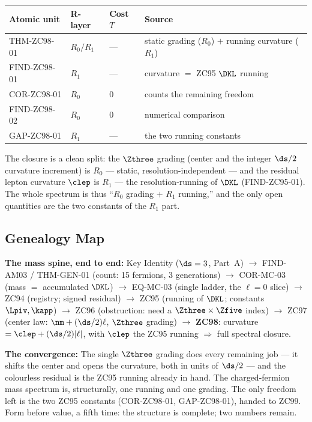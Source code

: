 \documentclass[12pt, a4paper]{article}
\begin{document}
\begin{layerbox}[title={R-Layer Assignments for ZC98}]
{\small\renewcommand{\arraystretch}{1.25}
\begin{center}
\begin{tabular}{@{}llll@{}}
\toprule
Atomic unit & R-layer & Cost $T$ & Source \\
\midrule
THM-ZC98-01  & $R_0/R_1$ & --- & static grading ($R_0$) $+$ running curvature ($R_1$) \\
FIND-ZC98-01 & $R_1$ & --- & curvature $=$ ZC95 $\DKL$ running \\
COR-ZC98-01  & $R_0$ & $0$ & counts the remaining freedom \\
FIND-ZC98-02 & $R_0$ & $0$ & numerical comparison \\
GAP-ZC98-01  & $R_1$ & --- & the two running constants \\
\bottomrule
\end{tabular}
\end{center}}
The closure is a clean split: the $\Zthree$ grading (center and the integer
$\ds/2$ curvature increment) is $R_0$ --- static, resolution-independent --- and
the residual lepton curvature $\clep$ is $R_1$ --- the resolution-running of
$\DKL$ (FIND-ZC95-01). The whole spectrum is thus ``$R_0$ grading $+$ $R_1$
running,'' and the only open quantities are the two constants of the $R_1$ part.
\end{layerbox}

\subsection{Genealogy Map}
\label{sec:genealogy-zc98}

\begin{genealogybox}[title={How ZC98 Sits in the Corpus --- and Closes Part~M's Spine}]
\textbf{The mass spine, end to end:}
Key Identity ($\ds=3$, Part~A) $\to$ FIND-AM03 / THM-GEN-01 (count: 15 fermions,
3 generations) $\to$ COR-MC-03 (mass $=$ accumulated $\DKL$) $\to$ EQ-MC-03
(single ladder, the $\ell=0$ slice) $\to$ ZC94 (registry; signed residual) $\to$
ZC95 (running of $\DKL$; constants $\Lpiv,\kapp$) $\to$ ZC96 (obstruction:
need a $\Zthree\times\Zfive$ index) $\to$ ZC97 (center law: $\nm+(\ds/2)\ell$,
$\Zthree$ grading) $\to$ \textbf{ZC98}: curvature $=\clep+(\ds/2)|\ell|$, with
$\clep$ the ZC95 running $\Rightarrow$ full spectral closure.

\smallskip
\textbf{The convergence:}
The single $\Zthree$ grading does every remaining job --- it shifts the center
and opens the curvature, both in units of $\ds/2$ --- and the colourless
residual is the ZC95 running already in hand. The charged-fermion mass spectrum
is, structurally, one running and one grading. The only freedom left is the two
ZC95 constants (COR-ZC98-01, GAP-ZC98-01), handed to ZC99. Form before value,
a fifth time: the structure is complete; two numbers remain.
\end{genealogybox}
\end{document}
